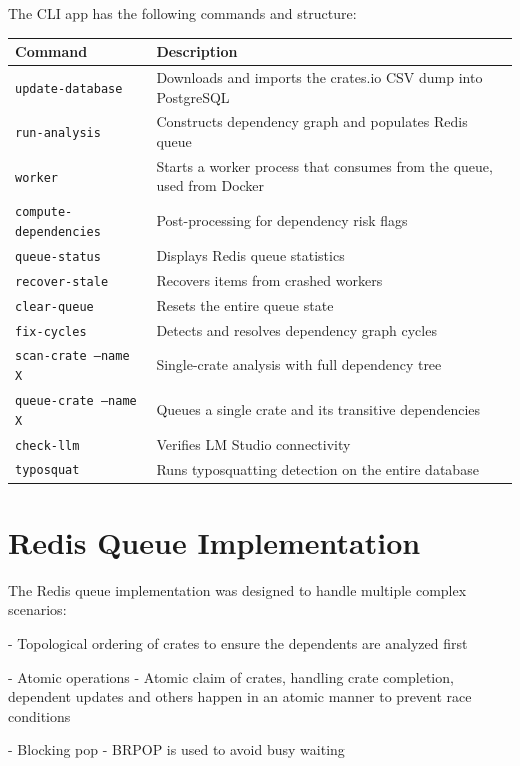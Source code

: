 The CLI app has the following commands and structure:

\begin{tabularx}{\textwidth}{|l|X|}
\hline
\textbf{Command} & \textbf{Description} \\
\hline
\texttt{update-database} & Downloads and imports the crates.io CSV dump into PostgreSQL \\
\hline
\texttt{run-analysis} & Constructs dependency graph and populates Redis queue \\
\hline
\texttt{worker} & Starts a worker process that consumes from the queue, used from Docker \\
\hline
\texttt{compute-dependencies} & Post-processing for dependency risk flags \\
\hline
\texttt{queue-status} & Displays Redis queue statistics \\
\hline
\texttt{recover-stale} & Recovers items from crashed workers \\
\hline
\texttt{clear-queue} & Resets the entire queue state \\
\hline
\texttt{fix-cycles} & Detects and resolves dependency graph cycles \\
\hline
\texttt{scan-crate --name X} & Single-crate analysis with full dependency tree \\
\hline
\texttt{queue-crate --name X} & Queues a single crate and its transitive dependencies \\
\hline
\texttt{check-llm} & Verifies LM Studio connectivity \\
\hline
\texttt{typosquat} & Runs typosquatting detection on the entire database \\
\hline
\end{tabularx}

\section{Redis Queue Implementation}\label{sect:redis-queue}

The Redis queue implementation was designed to handle multiple complex scenarios:

- Topological ordering of crates to ensure the dependents are analyzed first

- Atomic operations - Atomic claim of crates, handling crate completion, dependent updates and others happen in an atomic manner to prevent race conditions

- Blocking pop - BRPOP is used to avoid busy waiting

